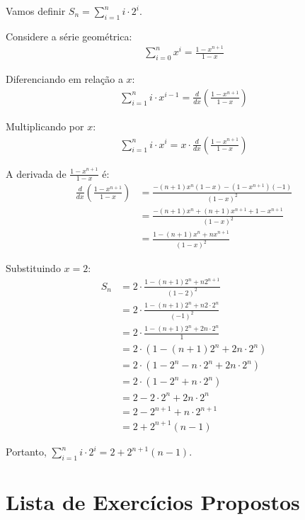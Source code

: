 \documentclass[12pt,a4paper]{article}
\begin{document}
\begin{tcolorbox}[colback=green!5!white,colframe=green!75!black,title=Resolução]
Vamos definir $S_n = \sum_{i=1}^{n} i \cdot 2^i$.

Considere a série geométrica:
\begin{align}
\sum_{i=0}^{n} x^i = \frac{1-x^{n+1}}{1-x}
\end{align}

Diferenciando em relação a $x$:
\begin{align}
\sum_{i=1}^{n} i \cdot x^{i-1} = \frac{d}{dx}\left(\frac{1-x^{n+1}}{1-x}\right)
\end{align}

Multiplicando por $x$:
\begin{align}
\sum_{i=1}^{n} i \cdot x^i = x \cdot \frac{d}{dx}\left(\frac{1-x^{n+1}}{1-x}\right)
\end{align}

A derivada de $\frac{1-x^{n+1}}{1-x}$ é:
\begin{align}
\frac{d}{dx}\left(\frac{1-x^{n+1}}{1-x}\right) &= \frac{-(n+1)x^n(1-x) - (1-x^{n+1})(-1)}{(1-x)^2}\\
&= \frac{-(n+1)x^n + (n+1)x^{n+1} + 1 - x^{n+1}}{(1-x)^2}\\
&= \frac{1 - (n+1)x^n + nx^{n+1}}{(1-x)^2}
\end{align}

Substituindo $x = 2$:
\begin{align}
S_n &= 2 \cdot \frac{1 - (n+1)2^n + n2^{n+1}}{(1-2)^2}\\
&= 2 \cdot \frac{1 - (n+1)2^n + n2 \cdot 2^n}{(-1)^2}\\
&= 2 \cdot \frac{1 - (n+1)2^n + 2n \cdot 2^n}{1}\\
&= 2 \cdot (1 - (n+1)2^n + 2n \cdot 2^n)\\
&= 2 \cdot (1 - 2^n - n \cdot 2^n + 2n \cdot 2^n)\\
&= 2 \cdot (1 - 2^n + n \cdot 2^n)\\
&= 2 - 2 \cdot 2^n + 2n \cdot 2^n\\
&= 2 - 2^{n+1} + n \cdot 2^{n+1}\\
&= 2 + 2^{n+1}(n-1)
\end{align}

Portanto, $\sum_{i=1}^{n} i \cdot 2^i = 2 + 2^{n+1}(n-1)$.
\end{tcolorbox}

\section{Lista de Exercícios Propostos}
\end{document}
